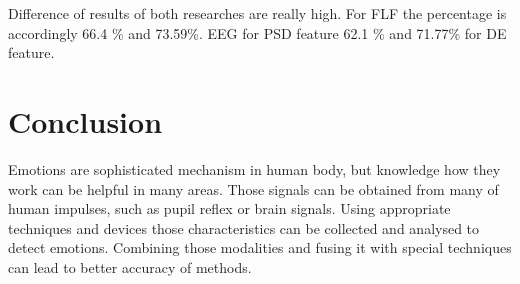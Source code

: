 \documentclass[10pt,journal,compsoc,twoside]{IEEEtran}
\begin{document}
Difference of results of both researches are really high. For FLF the percentage is  accordingly 66.4 \% and 73.59\%. EEG for PSD feature 62.1 \% and 71.77\% for DE feature.
\section{Conclusion}

Emotions are sophisticated mechanism in human body, but knowledge how they work can be helpful in many areas. Those signals can be obtained from many of human impulses, such as pupil reflex or brain signals. Using appropriate techniques and devices those characteristics can be collected and analysed to detect emotions. Combining those modalities and fusing it with special techniques can lead to better accuracy of methods.
	
\end{document}
